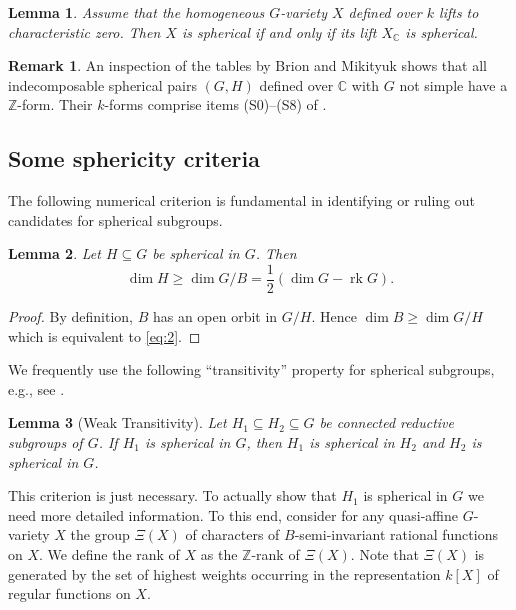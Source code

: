 \documentclass[12pt]{amsart}
\newcommand\BBC{{\mathbb C}}
\newcommand\BBZ{{\mathbb Z}}
\newcommand\rk{\operatorname{rk}}
\numberwithin{equation}{section}
\newtheorem{lemma}[lemma]{Lemma}
\theoremstyle{definition}
\newtheorem{remark}[remark]{Remark}
\begin{document}
\begin{lemma}
  \label{Theorem1}
  Assume that the homogeneous $G$-variety $X$ defined over $k$
  lifts to characteristic zero. Then $X$ is spherical if and only if its
  lift $X_\BBC$ is spherical.
\end{lemma}

\begin{remark}
  An inspection of the tables by Brion and Mikityuk shows that all
  indecomposable spherical pairs $(G,H)$ defined over $\BBC$ with $G$
  not simple have a $\BBZ$-form. Their $k$-forms comprise items
  (S0)--(S8) of .
\end{remark}

\subsection{Some sphericity criteria}

The following numerical criterion is fundamental in identifying or
ruling out candidates for spherical subgroups.

\begin{lemma}
  \label{lemma3}
  Let $H\subseteq G$ be spherical in $G$. Then
  \begin{equation}
    \label{eq:2}
    \dim H\geqslant\dim G/B=\frac{1}{2}(\dim G-\rk G).
  \end{equation}
\end{lemma}

\begin{proof}
  By definition, $B$ has an open orbit in $G/H$. Hence
  $\dim B\geqslant \dim G/H$ which is equivalent to \eqref{eq:2}.
\end{proof}

We frequently use the following ``transitivity'' property for
spherical subgroups, e.g., see \cite[Lem.~2.3]{KR}.

\begin{lemma}[Weak Transitivity]\label{lemma:weak}
  \label{lem:subgroups}
  Let $H_1\subseteq H_2\subseteq G$ be connected reductive subgroups
  of $G$.  If $H_1$ is spherical in $G$, then $H_1$ is spherical in
  $H_2$ and $H_2$ is spherical in $G$.
\end{lemma}

This criterion is just necessary. To actually show that $H_1$ is
spherical in $G$ we need more detailed information. To this end,
consider for any quasi-affine $G$-variety $X$ the group $\Xi(X)$ of
characters of $B$-semi-invariant rational functions on $X$. We define
the rank of $X$ as the $\BBZ$-rank of $\Xi(X)$. Note that $\Xi(X)$ is
generated by the set of highest weights occurring in the
representation $k[X]$ of regular functions on $X$.
\end{document}

